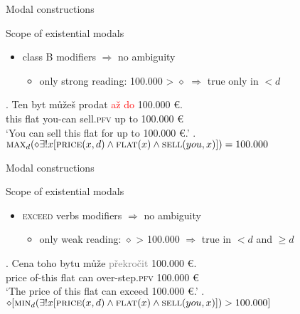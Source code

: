 \documentclass[12pt]{beamer}
\begin{document}
\begin{frame}{Modal constructions}

Scope of existential modals

\begin{itemize}
\item class B modifiers $\Rightarrow$ no ambiguity
\begin{itemize}
\item only strong reading: 100.000 > $\diamond$ $\Rightarrow$ true only in $< d$ 
\end{itemize}
\end{itemize}

\exg. Ten byt můžeš prodat \textcolor{red}{až} \textcolor{red}{do} 100.000 {\euro}.\\
this flat you-can sell.\textsc{pfv} up to 100.000 {\euro}\\
`You can sell this flat for up to 100.000 {\euro}.'
\a. $\textsc{max}_d(\diamond \exists ! x[\textsc{price}(x,d) \wedge \textsc{flat}(x) \wedge \textsc{sell}(you,x)])=100.000$\label{ex:classB-strong}

\end{frame}

\begin{frame}{Modal constructions}

Scope of existential modals

\begin{itemize}
\item \textsc{exceed} verbs modifiers $\Rightarrow$ no ambiguity
\begin{itemize}
\item only weak reading: $\diamond$ > 100.000 $\Rightarrow$ true in $< d$ and $\geq d$ 
\end{itemize}
\end{itemize}

\exg. Cena toho bytu může \textcolor{gray}{překročit} 100.000 {\euro}.\label{ex:classA-prefix}\\
price of-this flat can over-step.\textsc{pfv} 100.000 {\euro}\\
`The price of this flat can exceed 100.000 {\euro}.'
\a. $\diamond[\textsc{min}_d(\exists !x[\textsc{price}(x,d) \wedge \textsc{flat}(x) \wedge \textsc{sell}(you,x)]) > 100.000]$

\end{frame}
\end{document}
